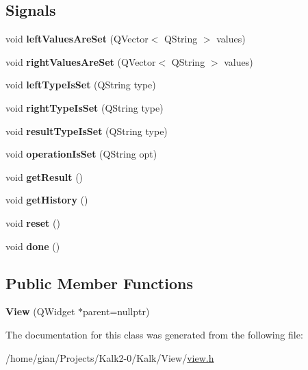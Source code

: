 \subsection*{Signals}
\begin{DoxyCompactItemize}
\item 
\mbox{\label{class_view_a96f2fd0ed3467a0e5072e9a4a5593395}} 
void {\bfseries left\+Values\+Are\+Set} (Q\+Vector$<$ Q\+String $>$ values)
\item 
\mbox{\label{class_view_aef26164c727b9a1b83ca0e84c00a0060}} 
void {\bfseries right\+Values\+Are\+Set} (Q\+Vector$<$ Q\+String $>$ values)
\item 
\mbox{\label{class_view_ae0775d09884cd6b001829df4276e407c}} 
void {\bfseries left\+Type\+Is\+Set} (Q\+String type)
\item 
\mbox{\label{class_view_a29e8b493fdbca2747da4ffa855ab966c}} 
void {\bfseries right\+Type\+Is\+Set} (Q\+String type)
\item 
\mbox{\label{class_view_aa510baf4ace905a146c2655ca4a4b55e}} 
void {\bfseries result\+Type\+Is\+Set} (Q\+String type)
\item 
\mbox{\label{class_view_af4cf1863986a0fac18d6da46c97329de}} 
void {\bfseries operation\+Is\+Set} (Q\+String opt)
\item 
\mbox{\label{class_view_ac05f93e75953488aa1a5a3f813603032}} 
void {\bfseries get\+Result} ()
\item 
\mbox{\label{class_view_a0cf275613b9eb5cc57e2069df61a87e1}} 
void {\bfseries get\+History} ()
\item 
\mbox{\label{class_view_a84eea48d2036da09640369d7997d957b}} 
void {\bfseries reset} ()
\item 
\mbox{\label{class_view_af0a5104e717bfe94ae35a1dfd9d5e183}} 
void {\bfseries done} ()
\end{DoxyCompactItemize}
\subsection*{Public Member Functions}
\begin{DoxyCompactItemize}
\item 
\mbox{\label{class_view_a3fd5b2cd3d7ccfc51dd4b2730833180c}} 
{\bfseries View} (Q\+Widget $\ast$parent=nullptr)
\end{DoxyCompactItemize}


The documentation for this class was generated from the following file\+:\begin{DoxyCompactItemize}
\item 
/home/gian/\+Projects/\+Kalk2-\/0/\+Kalk/\+View/\hyperlink{view_8h}{view.\+h}\end{DoxyCompactItemize}
